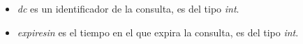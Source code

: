 \begin{enumerate}
\begin{itemize}
\begin{itemize}
			\item \emph{dc} es un identificador de la consulta, es del tipo \emph{int}.

			\item \emph{expires\textunderscore in} es el tiempo en el que expira la consulta, es del tipo \emph{int}.
		\end{itemize}
	\end{itemize}
\end{enumerate}

